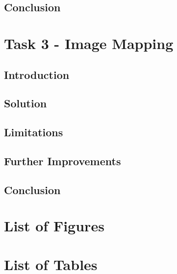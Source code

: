 \documentclass{article}
\begin{document}
\subsection{Conclusion}
\section{Task 3 - Image Mapping}
\subsection{Introduction}
\subsection{Solution}
\subsection{Limitations}
\subsection{Further Improvements}
\subsection{Conclusion}




\newpage
{}
\printbibliography
\appendix

\section{List of Figures}
\listoffigures
\section{List of Tables}
\listoftables
\end{document}
